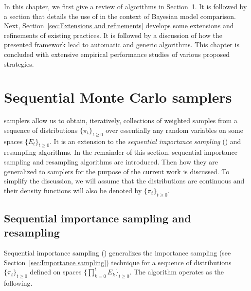 In this chapter, we first give a review of \smc algorithms in Section~\ref{sec:Sequential Monte Carlo samplers}. It is followed by a section that details the use of \smc in the context of Bayesian model comparison. Next, Section~\ref{sec:Extensions and refinements} develops some extensions and refinements of existing practices. It is followed by a discussion of how the presented framework lead to automatic and generic algorithms. This chapter is concluded with extensive empirical performance studies of various proposed strategies.

\section{Sequential Monte Carlo samplers}
\label{sec:Sequential Monte Carlo samplers}

\smc samplers allow us to obtain, iteratively, collections of weighted samples from a sequence of distributions $\{\pi_t\}_{t\ge0}$ over essentially any random variables on some spaces $\{E_t\}_{t\ge0}$. It is an extension to the \emph{sequential importance sampling} (\sis) and resampling algorithms. In the remainder of this section, sequential importance sampling and resampling algorithms are introduced. Then how they are generalized to \smc samplers for the purpose of the current work is discussed. To simplify the discussion, we will assume that the distributions are continuous and their density functions will also be denoted by $\{\pi_t\}_{t\ge0}$.

\subsection{Sequential importance sampling and resampling}
\label{sub:Sequential importance sampling and resampling}

Sequential importance sampling (\sis) generalizes the importance sampling (see Section~\ref{sec:Importance sampling}) technique for a sequence of distributions $\{\pi_t\}_{t\ge0}$ defined on spaces $\{\prod_{k=0}^tE_k\}_{t\ge0}$. The algorithm operates as the following.

